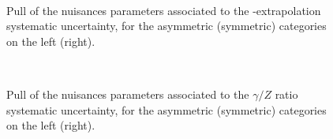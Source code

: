 \clearpage
\begin{figure}[tbhp]
    \caption{ Pull of the nuisances parameters associated to the \alt-extrapolation systematic uncertainty, 
      for the asymmetric (symmetric) categories on the left (right).
      \label{fig:nuisPull_AlphaT}}
  \begin{center}
     ~~
  \end{center}
\end{figure}

\begin{figure}[tbhp]
    \caption{ Pull of the nuisances parameters associated to the $\gamma/Z$ ratio systematic uncertainty, 
      for the asymmetric (symmetric) categories on the left (right).
      \label{fig:nuisPull_gamma_Z_ratio}}
  \begin{center}
     ~~
  \end{center}
\end{figure}

